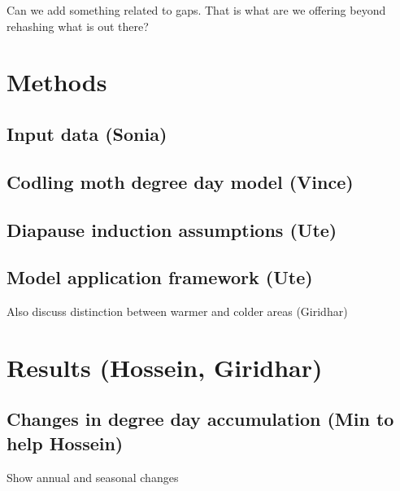 \documentclass[12pt]{article}
\theoremstyle{plain}
\theoremstyle{definition}
\theoremstyle{definition}
\begin{document}
Can we add something related to gaps. That is what are we offering beyond rehashing what is out there?

\section{Methods}
\subsection{Input data  (Sonia)}
\subsection{Codling moth degree day model (Vince)}
\subsection{Diapause induction assumptions (Ute)}
\subsection{Model application framework (Ute)}

Also discuss distinction between warmer and  colder areas (Giridhar)

\section{Results (Hossein, Giridhar)}
\subsection{Changes in degree day accumulation (Min to help Hossein)}
Show annual and seasonal changes
\end{document}

